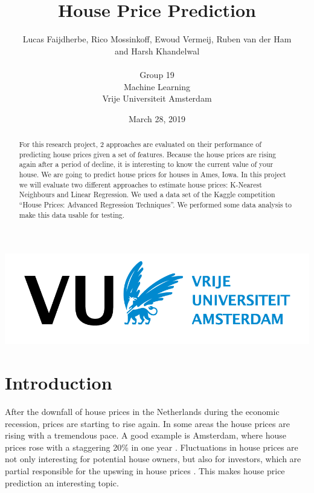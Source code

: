 \documentclass[a4paper,11pt]{article}
\title{House Price Prediction}
\date{March 28, 2019}
\author{Lucas Faijdherbe, Rico Mossinkoff, Ewoud Vermeij, Ruben van der Ham\\ and Harsh Khandelwal\\\\
Group 19\\
\small Machine Learning\\
\small Vrije Universiteit Amsterdam}
\begin{document}
\begin{titlepage}

\centering
\maketitle
\includegraphics[width=0.8\linewidth]{images/vulogo.png}
\hfill
\\


\begin{abstract}
For this research project, 2 approaches are evaluated on their performance of predicting house prices given a set of features. Because the house prices are rising again after a period of decline, it is interesting to know the current value of your house. We are going to predict house prices for houses in Ames, Iowa.
    In this project we will evaluate two different approaches to estimate house prices: K-Nearest Neighbours and Linear Regression. We used a data set of the Kaggle competition “House Prices: Advanced Regression Techniques”. We performed some data analysis to make this data usable for testing. 
\end{abstract}
\end{titlepage}



\clearpage
{} %


\section{Introduction}
After the downfall of house prices in the Netherlands during the economic recession, prices are starting to rise again. In some areas the house prices are rising with a tremendous pace. A good example is Amsterdam, where house prices rose with a staggering 20\% in one year \cite{couzy_damen_2018}. Fluctuations in house prices are not only interesting for potential house owners, but also for investors, which are partial responsible for the upswing in house prices \cite{couzy_2018}. This makes house price prediction an interesting topic.\\
\end{document}
